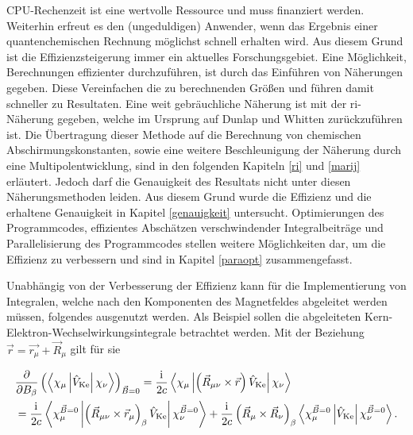 CPU-Rechenzeit ist eine wertvolle Ressource und muss finanziert werden. Weiterhin erfreut es den (ungeduldigen) Anwender, wenn das Ergebnis einer quantenchemischen Rechnung möglichst schnell erhalten wird. Aus diesem Grund ist die Effizienzsteigerung immer ein aktuelles Forschungsgebiet. Eine Möglichkeit, Berechnungen effizienter durchzuführen, ist durch das Einführen von Näherungen gegeben. Diese Vereinfachen die zu berechnenden Größen und führen damit schneller zu Resultaten. Eine weit gebräuchliche Näherung ist mit der \ac{ri}-Näherung gegeben\supercite{vahtras1993integral}, welche im Ursprung auf Dunlap\supercite{dunlap1979some} und Whitten\supercite{whitten1973coulombic} zurückzuführen ist. Die Übertragung dieser Methode auf die Berechnung von chemischen Abschirmungskonstanten, sowie eine weitere Beschleunigung der Näherung durch eine Multipolentwicklung, sind in den folgenden Kapiteln \ref{ri} und \ref{marij} erläutert. Jedoch darf die Genauigkeit des Resultats nicht unter diesen Näherungsmethoden leiden. Aus diesem Grund wurde die Effizienz und die erhaltene Genauigkeit in Kapitel \ref{genauigkeit} untersucht. Optimierungen des Programmcodes, effizientes Abschätzen verschwindender Integralbeiträge und Parallelisierung des Programmcodes stellen weitere Möglichkeiten dar, um die Effizienz zu verbessern und sind in Kapitel \ref{paraopt} zusammengefasst. 

\bigskip
Unabhängig von der Verbesserung der Effizienz kann für die Implementierung von Integralen, welche nach den Komponenten des Magnetfeldes abgeleitet werden müssen, folgendes ausgenutzt werden. Als Beispiel sollen die abgeleiteten Kern-Elektron-Wechselwirkungsintegrale betrachtet werden. Mit der Beziehung $\vec{r}=\vec{r_\mu}+\vec{R}_\mu$ gilt für sie

\begin{equation}\label{eq:vmunudb}
\begin{aligned}
&\frac{\partial}{\partial B_\beta}\left(\left\langle\chi_{\mu}\left\vert\hat{V}_{\textrm{Ke}}\right\vert\chi_{\nu}\right\rangle\right)_{\vec{B}=0}=\frac{\mathrm{i}\mkern1mu}{2c}\left\langle\chi_{\mu}\left\vert\left(\vec{R}_{\mu\nu}\times\vec{r}\right)\hat{V}_{\textrm{Ke}}\right\vert\chi_{\nu}\right\rangle\\
&=\frac{\mathrm{i}\mkern1mu}{2c}\left\langle\chi_\mu^{\vec{B}=0}\left\vert\left(\vec{R}_{\mu\nu}\times\vec{r}_\mu\right)_\beta\hat{V}_{\textrm{Ke}}\right\vert\chi_\nu^{\vec{B}=0}\right\rangle+\frac{\mathrm{i}\mkern1mu}{2c}\left(\vec{R}_\mu\times\vec{R}_\nu\right)_\beta\left\langle\chi_{\mu}^{\vec{B}=0}\left\vert\hat{V}_{\textrm{Ke}}\right\vert\chi_{\nu}^{\vec{B}=0}\right\rangle.
\end{aligned}
\end{equation}

